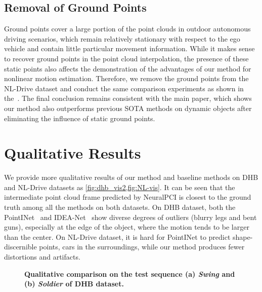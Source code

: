 \documentclass[10pt,twocolumn,letterpaper]{article}
\begin{document}
\subsection{Removal of Ground Points}

Ground points cover a large portion of the point clouds in outdoor autonomous driving scenarios, which remain relatively stationary with respect to the ego vehicle and contain little particular movement information. While it makes sense to recover ground points in the point cloud interpolation, the presence of these static points also affects the demonstration of the advantages of our method for nonlinear motion estimation. Therefore, we remove the ground points from the NL-Drive dataset and conduct the same comparison experiments as shown in the~. The final conclusion remains consistent with the main paper, which shows our method also outperforms previous SOTA methods on dynamic objects after eliminating the influence of static ground points.



\section{Qualitative Results}
\label{sec:appendix qualitative experiments}

We provide more qualitative results of our method and baseline methods on DHB and NL-Drive datasets as \cref{fig:dhb_vis2,fig:NL-vis}. It can be seen that the intermediate point cloud frame predicted by NeuralPCI is closest to the ground truth among all the methods on both datasets. On DHB dataset, both the PointINet~\cite{lu2021pointinet} and IDEA-Net~\cite{zeng2022idea} show diverse degrees of outliers (\eg blurry legs and bent guns), especially at the edge of the object, where the motion tends to be larger than the center. On NL-Drive dataset, it is hard for PointINet to predict shape-discernible points, \eg cars in the surroundings, while our method produces fewer distortions and artifacts. 



\begin{figure*} 
\centering    
{}    

\caption{\textbf{Qualitative comparison on the test sequence (a) \textit{Swing} and (b) \textit{Soldier} of DHB dataset.} }     
\label{fig:dhb_vis2}  
\end{figure*}
\end{document}
